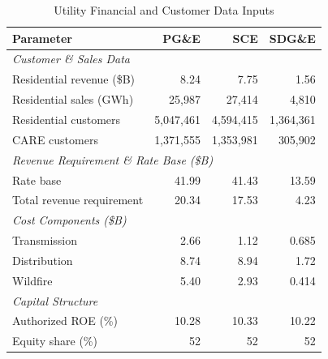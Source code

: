 
\begin{table}[htbp]
\centering
\caption{Utility Financial and Customer Data Inputs}
\label{tab:utility_data_inputs}
\begin{tabular}{l r r r}
\hline
\textbf{Parameter} & \textbf{PG\&E} & \textbf{SCE} & \textbf{SDG\&E} \\
\hline
\multicolumn{4}{l}{\textit{Customer \& Sales Data}} \\
Residential revenue (\$B)       & 8.24   & 7.75   & 1.56   \\
Residential sales (GWh)         & 25,987 & 27,414 & 4,810  \\
Residential customers           & 5,047,461 & 4,594,415 & 1,364,361 \\
CARE customers                  & 1,371,555 & 1,353,981 & 305,902 \\
\hline
\multicolumn{4}{l}{\textit{Revenue Requirement \& Rate Base (\$B)}} \\
Rate base                       & 41.99  & 41.43  & 13.59  \\
Total revenue requirement       & 20.34  & 17.53  & 4.23   \\
\hline
\multicolumn{4}{l}{\textit{Cost Components (\$B)}} \\
Transmission                    & 2.66   & 1.12   & 0.685  \\
Distribution                    & 8.74   & 8.94   & 1.72   \\
Wildfire                        & 5.40   & 2.93   & 0.414  \\
\hline
\multicolumn{4}{l}{\textit{Capital Structure}} \\
Authorized ROE (\%)             & 10.28  & 10.33  & 10.22  \\
Equity share (\%)               & 52     & 52     & 52     \\
\hline
\end{tabular}
\end{table}

%
%

